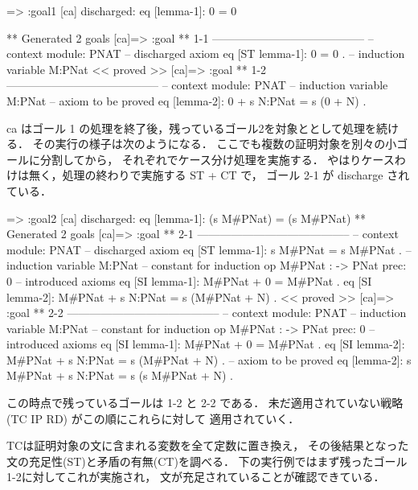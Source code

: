 \documentclass[a4paper,oneside,10pt,here]{memoir}
\newenvironment{vvtm}%
{\parskip=0pt\lineskip=0pt\begin{center}\begin{minipage}{0.8\textwidth}\begin{snugshade}}%
  {\end{snugshade}\end{minipage}\end{center}}
\begin{document}
\begin{vvtm}
\begin{simplev}
[ca]=> :goal{1}
[ca] discharged: eq [lemma-1]: 0 = 0

** Generated 2 goals
[ca]=>
:goal { ** 1-1 -----------------------------------------
  -- context module: PNAT
  -- discharged axiom
    eq [ST lemma-1]: 0 = 0 .
  -- induction variable
    M:PNat
} << proved >>
[ca]=>
:goal { ** 1-2 -----------------------------------------
  -- context module: PNAT
  -- induction variable
    M:PNat
  -- axiom to be proved
    eq [lemma-2]: 0 + s N:PNat = s (0 + N) .
}
\end{simplev}
\end{vvtm}

ca はゴール 1 の処理を終了後，残っているゴール2を対象ととして処理を続ける．
その実行の様子は次のようになる．
ここでも複数の証明対象を別々の小ゴールに分割してから，
それぞれでケース分け処理を実施する．
やはりケースわけは無く，処理の終わりで実施する ST + CT で，
ゴール 2-1 が discharge されている．

\begin{vvtm}
\begin{simplev}
[ca]=> :goal{2}
[ca] discharged: eq [lemma-1]: (s M#PNat) = (s M#PNat)
** Generated 2 goals
[ca]=>
:goal { ** 2-1 -----------------------------------------
  -- context module: PNAT
  -- discharged axiom
    eq [ST lemma-1]: s M#PNat = s M#PNat .
  -- induction variable
    M:PNat
  -- constant for induction
    op M#PNat : -> PNat { prec: 0 }
  -- introduced axioms
    eq [SI lemma-1]: M#PNat + 0 = M#PNat .
    eq [SI lemma-2]: M#PNat + s N:PNat = s (M#PNat + N) .
} << proved >>
[ca]=>
:goal { ** 2-2 -----------------------------------------
  -- context module: PNAT
  -- induction variable
    M:PNat
  -- constant for induction
    op M#PNat : -> PNat { prec: 0 }
  -- introduced axioms
    eq [SI lemma-1]: M#PNat + 0 = M#PNat .
    eq [SI lemma-2]: M#PNat + s N:PNat = s (M#PNat + N) .
  -- axiom to be proved
    eq [lemma-2]: s M#PNat + s N:PNat = s (s M#PNat + N) .
}
\end{simplev}
\end{vvtm}

この時点で残っているゴールは 1-2 と 2-2 である．
未だ適用されていない戦略 (TC IP RD) がこの順にこれらに対して
適用されていく．

TCは証明対象の文に含まれる変数を全て定数に置き換え，
その後結果となった文の充足性(ST)と矛盾の有無(CT)を調べる．
下の実行例ではまず残ったゴール1-2に対してこれが実施され，
文が充足されていることが確認できている．
\end{document}
